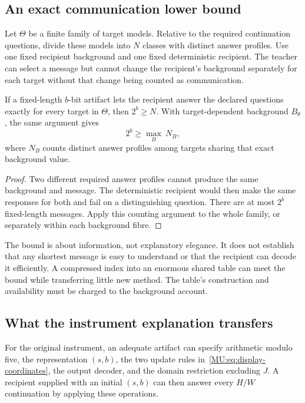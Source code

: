 \subsection{An exact communication lower bound}
Let $\Theta$ be a finite family of target models. Relative to the required continuation questions, divide these models into $N$ classes with distinct answer profiles. Use one fixed recipient background and one fixed deterministic recipient. The teacher can select a message but cannot change the recipient's background separately for each target without that change being counted as communication.

\begin{MUproposition}\label{MU:prop:explanation}
If a fixed-length $b$-bit artifact lets the recipient answer the declared questions exactly for every target in $\Theta$, then $2^b\geq N$. With target-dependent background $B_\theta$, the same argument gives
\[
2^b\geq\max_{B}\ N_B,
\]
where $N_B$ counts distinct answer profiles among targets sharing that exact background value.
\end{MUproposition}
\begin{proof}
Two different required answer profiles cannot produce the same background and message. The deterministic recipient would then make the same responses for both and fail on a distinguishing question. There are at most $2^b$ fixed-length messages. Apply this counting argument to the whole family, or separately within each background fibre.
\end{proof}
The bound is about information, not explanatory elegance. It does not establish that any shortest message is easy to understand or that the recipient can decode it efficiently. A compressed index into an enormous shared table can meet the bound while transferring little new method. The table's construction and availability must be charged to the background account.

\subsection{What the instrument explanation transfers}
For the original instrument, an adequate artifact can specify arithmetic modulo five, the representation $(s,b)$, the two update rules in~\eqref{MU:eq:display-coordinates}, the output decoder, and the domain restriction excluding $J$. A recipient supplied with an initial $(s,b)$ can then answer every $H/W$ continuation by applying these operations.

